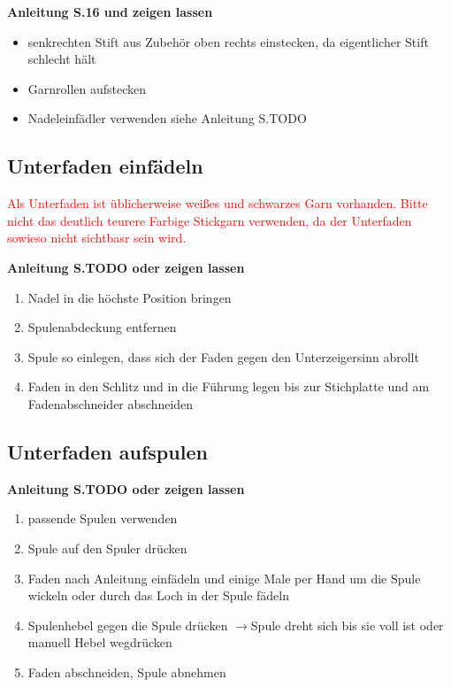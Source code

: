 \documentclass{\basedir/fablab-document}
\newcommand{\pfeil}{\ensuremath{\rightarrow}}
\begin{document}
\textbf{Anleitung S.16 und zeigen lassen}
\begin{itemize}
	\item senkrechten Stift aus Zubehör oben rechts einstecken, da eigentlicher Stift schlecht hält
	\item Garnrollen aufstecken
	\item Nadeleinfädler verwenden siehe Anleitung S.TODO
\end{itemize}

\vspace{2em}

\subsection{Unterfaden einfädeln}
\textcolor{red}{Als Unterfaden ist üblicherweise weißes und schwarzes Garn vorhanden. Bitte nicht das deutlich teurere Farbige Stickgarn verwenden, da der Unterfaden sowieso nicht sichtbasr sein wird.}

\vspace{1em}
\textbf{Anleitung S.TODO oder zeigen lassen}
\begin{enumerate}
	\item Nadel in die höchste Position bringen
	\item Spulenabdeckung entfernen
	\item Spule so einlegen, dass sich der Faden gegen den Unterzeigersinn abrollt
	\item Faden in den Schlitz und in die Führung legen bis zur Stichplatte und am Fadenabschneider abschneiden
\end{enumerate}

\subsection{Unterfaden aufspulen}
\textbf{Anleitung S.TODO oder zeigen lassen}
\begin{enumerate}
	\item passende Spulen verwenden
	\item Spule auf den Spuler drücken
	\item Faden nach Anleitung einfädeln und einige Male per Hand um die Spule wickeln oder durch das Loch in der Spule fädeln
	\item Spulenhebel gegen die Spule drücken \pfeil Spule dreht sich bis sie voll ist oder manuell Hebel wegdrücken
	\item Faden abschneiden, Spule abnehmen
\end{enumerate}
\end{document}
